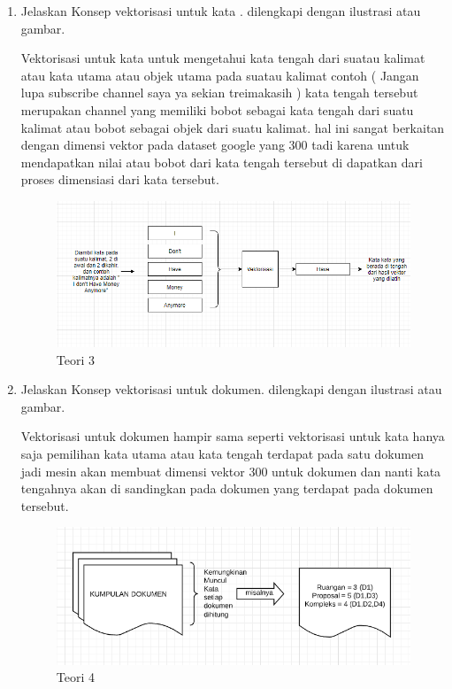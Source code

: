 \begin{enumerate}
\item Jelaskan Konsep vektorisasi untuk kata . dilengkapi dengan ilustrasi atau gambar. \par
Vektorisasi untuk kata untuk mengetahui kata tengah dari suatau kalimat atau kata utama atau objek utama pada suatau kalimat contoh ( Jangan lupa subscribe channel saya ya sekian treimakasih ) kata tengah tersebut merupakan channel yang memiliki bobot sebagai kata tengah dari suatu kalimat atau bobot sebagai objek dari suatu kalimat. hal ini sangat berkaitan dengan dimensi vektor pada dataset google yang 300 tadi karena untuk mendapatkan nilai atau bobot dari kata tengah tersebut di dapatkan dari proses dimensiasi dari kata tersebut. 

\begin{figure}[ht]
\centering
\includegraphics[scale=0.3]{figures/1174002/chapter5/3.PNG}
\caption{Teori 3}
\label{contoh}
\end{figure}

\item Jelaskan Konsep vektorisasi untuk dokumen. dilengkapi dengan ilustrasi atau gambar. \par
Vektorisasi untuk dokumen hampir sama seperti vektorisasi untuk kata hanya saja pemilihan kata utama atau kata tengah terdapat pada satu dokumen jadi mesin akan membuat dimensi vektor 300 untuk dokumen dan nanti kata tengahnya akan di sandingkan pada dokumen yang terdapat pada dokumen tersebut.

\begin{figure}[ht]
\centering
\includegraphics[scale=0.3]{figures/1174002/chapter5/4.PNG}
\caption{Teori 4}
\label{contoh}
\end{figure}


\end{enumerate}
